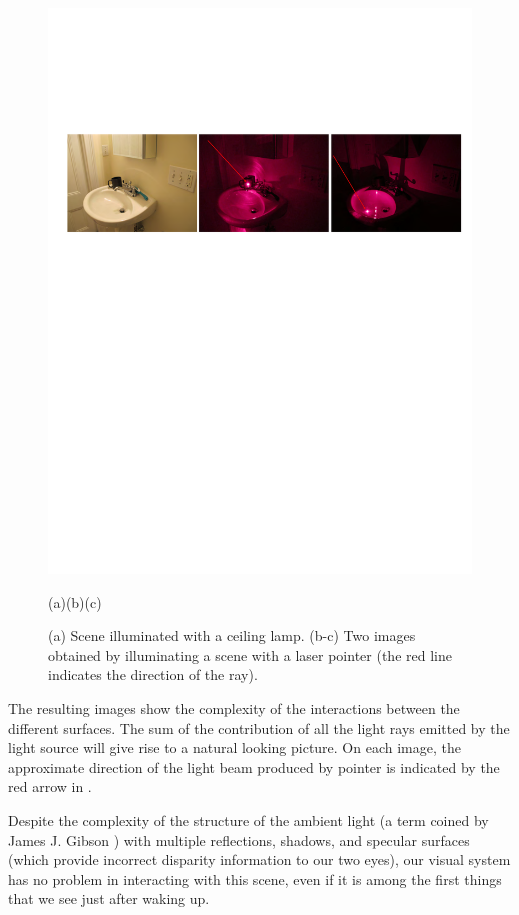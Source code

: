 \begin{figure}[t]
    \centerline{
        \includegraphics[width=1\linewidth]{figures/taxonomy/lightGray2.pdf}
    }
    \centerline{
        (a)\hspace{1.5in}(b)\hspace{1.5in}(c)
    }
    \caption{(a) Scene illuminated with a ceiling lamp. (b-c) Two images obtained by illuminating a scene with a laser pointer (the red line indicates the direction of the ray).}
    \label{fig:lightRay}
\end{figure}

The resulting images show the complexity of the interactions between the different surfaces. The sum of the contribution of all the light rays emitted by the light source will give rise to a natural looking picture. On each image, the approximate direction of the light beam produced by pointer is indicated by the red arrow in .

Despite the complexity of the structure of the ambient light (a term coined by James J. Gibson \cite{Gibson1966}) with multiple reflections, shadows, and specular surfaces (which provide incorrect disparity information to our two eyes), our visual system has no problem in interacting with this scene, even if it is among the first things that we see just after waking up.



